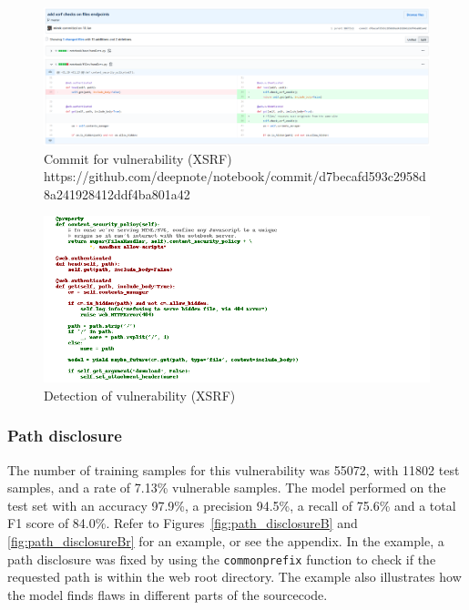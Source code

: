 \documentclass[
a4paper,
pagesize,
pdftex,
12pt,
twoside, %
BCOR=5mm, %
ngerman,
fleqn,
final,
]{scrartcl}
\begin{document}
	\begin{figure}[H]
		\centering
		\includegraphics[width=\linewidth]{Images/xsrfA}
		\caption{Commit for vulnerability (XSRF) \newline \scriptsize{https://github.com/deepnote/notebook/commit/d7becafd593c2958d8a241928412ddf4ba801a42
		}}
		\label{fig:xsrfA}
	\end{figure}
	\begin{figure}[H]
		\centering
		\includegraphics[width=\linewidth]{Images/xsrfAr}
		\caption{Detection of vulnerability (XSRF)}
		\label{fig:xsrfAr}
	\end{figure}

	\subsubsection{Path disclosure}
	The number of training samples for this vulnerability was 55072, with 11802 test samples, and a rate of 7.13\% vulnerable samples. The model performed on the test set with an accuracy 97.9\%, a precision 94.5\%, a recall of 75.6\% and a total F1 score of 84.0\%. Refer to Figures~\ref{fig:path_disclosureB} and \ref{fig:path_disclosureBr} for an example, or see the appendix. In the example, a path disclosure was fixed by using the \texttt{commonprefix} function to check if the requested path is within the web root directory. The example also illustrates how the model finds flaws in different parts of the sourcecode.
	
\end{document}
